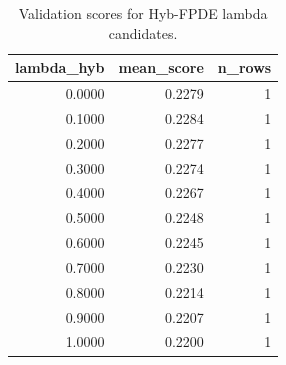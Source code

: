 \begin{table}[t]
\caption{Validation scores for Hyb-FPDE lambda candidates.}
\label{tab:lambda_distribution_computed}
\centering
\begin{tabular}{rrr}
\toprule
lambda\_hyb & mean\_score & n\_rows \\
\midrule
0.0000 & 0.2279 & 1 \\
0.1000 & 0.2284 & 1 \\
0.2000 & 0.2277 & 1 \\
0.3000 & 0.2274 & 1 \\
0.4000 & 0.2267 & 1 \\
0.5000 & 0.2248 & 1 \\
0.6000 & 0.2245 & 1 \\
0.7000 & 0.2230 & 1 \\
0.8000 & 0.2214 & 1 \\
0.9000 & 0.2207 & 1 \\
1.0000 & 0.2200 & 1 \\
\bottomrule
\end{tabular}

\end{table}
